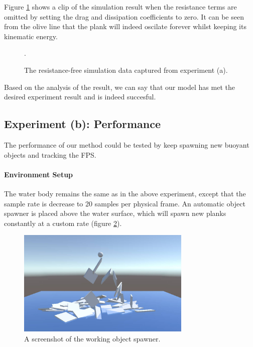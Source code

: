 Figure \ref{experiment-no-resistance} shows a clip of the simulation result when the resistance terms are omitted by setting the drag and  dissipation coefficients to zero.
It can be seen from the olive line that the plank will indeed oscilate forever whilst keeping its kinematic energy.

\begin{figure}[htb]
	\centering
	\caption{The resistance-free simulation data captured from experiment (a).}.
	\label{experiment-no-resistance}
\end{figure}

Based on the analysis of the result, we can say that our model has met the desired experiment result and is indeed succesful.

\subsection{Experiment (b): Performance}

The performance of our method could be tested by keep spawning new buoyant objects and tracking the FPS.

\paragraph*{Environment Setup}

The water body remains the same as in the above experiment, except that the sample rate is decrease to 20 samples per physical frame.
An automatic object spawner is placed above the water surface, which will spawn new planks constantly at a custom rate (figure \ref{spawner-setup}).

\begin{figure}[h]
	\centering
	\includegraphics[height=2in]{figures/spawner-setup.jpg}
	\caption{A screenshot of the working object spawner.}
	\label{spawner-setup}
\end{figure}

